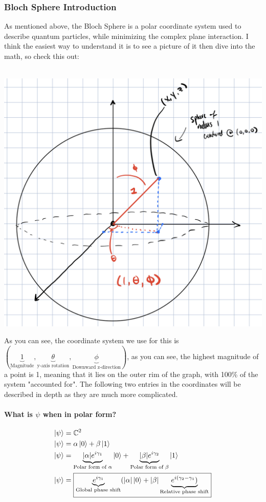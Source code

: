 \documentclass[12pt]{article}
\theoremstyle{plain}
\theoremstyle{nonumberplain}
\theoremstyle{plain}
\theoremstyle{nonumberplain}
\newcommand\1{{\bf 1}}
\newcommand{\C}{\mathbb{C}} %
\newcommand{\<}{\left\langle}
\renewcommand{\>}{\right\rangle}
\begin{document}
\subsubsection{Bloch Sphere Introduction}
As mentioned above, the Bloch Sphere is a polar coordinate system used to describe quantum particles, while minimizing the complex plane interaction.  I think the easiest way to understand it is to see a picture of it then dive into the math, so check this out:\\
\\
\begin{center}
\includegraphics[scale=.3]{bloch}
\end{center}
As you can see, the coordinate system we use for this is $(\underbrace{1}_{\text{Magnitude}},\underbrace{\theta}_{\text{y-axis rotation}},\underbrace{\phi}_{\text{Downward z-direction}})$, as you can see, the highest magnitude of a point is 1, meaning that it lies on the outer rim of the graph, with 100\% of the system "accounted for".  The following two entries in the coordinates will be described in depth as they are much more complicated.
\paragraph{What is $\psi$ when in polar form?} 
\begin{equation}
\begin{split}
\ket{\psi} &= \C^2 \\
\ket{\psi} &= \alpha\ket{0} + \beta\ket{1} \\
\ket{\psi} &= \underbrace{|\alpha| e^{i\gamma_1}}_{\text{Polar form of $\alpha$}}\ket{0}+\underbrace{|\beta| e^{i\gamma_2}}_{\text{Polar form of $\beta$}}\ket{1}\\
\ket{\psi} &= \boxed{\underbrace{e^{i\gamma_1}}_{\text{Global phase shift}}(|\alpha| \ket{0} + |\beta| \underbrace{e^{i(\gamma_2-\gamma_1})}_{\text{Relative phase shift}}}
\end{split}
\end{equation}
\end{document}
